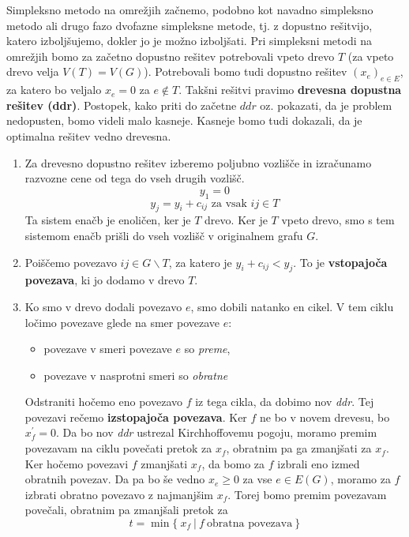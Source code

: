 \documentclass[11pt, a4paper]{article}
\begin{document}
    Simpleksno metodo na omrežjih začnemo, podobno kot navadno simpleksno metodo ali drugo fazo dvofazne simpleksne metode, tj. z dopustno rešitvijo, katero izboljšujemo, dokler jo je možno izboljšati. Pri simpleksni metodi na omrežjih bomo za začetno dopustno rešitev potrebovali vpeto drevo \(T\) (za vpeto drevo velja \(V(T)=V(G)\)). Potrebovali bomo tudi dopustno rešitev \((x_e)_{e \in E}\), za katero bo veljalo \(x_e=0\) za \(e \notin T\). Takšni rešitvi pravimo \textbf{drevesna dopustna rešitev (ddr)}. Postopek, kako priti do začetne \(ddr\) oz. pokazati, da je problem nedopusten, bomo videli malo kasneje. Kasneje bomo tudi dokazali, da je optimalna rešitev vedno drevesna.
    \par
    

    \begin{enumerate}
        \item Za drevesno dopustno rešitev izberemo poljubno vozlišče in izračunamo razvozne cene od tega do vseh drugih vozlišč.
            \[
                y_1 = 0    
            \]
            \[
                y_j = y_i + c_{ij} \text{ za vsak } ij \in T   
            \]
            Ta sistem enačb je enoličen, ker je \(T\) drevo. Ker je \(T\) vpeto drevo, smo s tem sistemom enačb prišli do vseh vozlišč v originalnem grafu \(G\).

        \item Poiščemo povezavo \(ij \in G \backslash T\), za katero je \(y_i + c_{ij} < y_j\). To je \textbf{vstopajoča povezava}, ki jo dodamo v drevo \(T\).
        
        \item Ko smo v drevo dodali povezavo \(e\), smo dobili natanko en cikel. V tem ciklu ločimo povezave glede na smer povezave \(e\):
            \begin{itemize}
                \item povezave v smeri povezave \(e\) so \textit{preme},
                \item povezave v nasprotni smeri so \textit{obratne}
            \end{itemize}
        
            Odstraniti hočemo eno povezavo \(f\) iz tega cikla, da dobimo nov \textit{ddr}. Tej povezavi rečemo \textbf{izstopajoča povezava}. Ker \(f\) ne bo v novem drevesu, bo \(x^\prime_f=0\). Da bo nov \textit{ddr} ustrezal Kirchhoffovemu pogoju, moramo premim povezavam na ciklu povečati pretok za \(x_f\), obratnim pa ga zmanjšati za \(x_f\). Ker hočemo povezavi \(f\) zmanjšati \(x_f\), da bomo za \(f\) izbrali eno izmed obratnih povezav. Da pa bo še vedno \(x_e \ge 0\) za vse \(e \in E(G)\), moramo za \(f\) izbrati obratno povezavo z najmanjšim \(x_f\). Torej bomo premim povezavam povečali, obratnim pa zmanjšali pretok za
            \[
                t = \min \{\ x_f\ |\ f\ \text{obratna povezava}\ \}    
            \]
    \end{enumerate}
\end{document}
